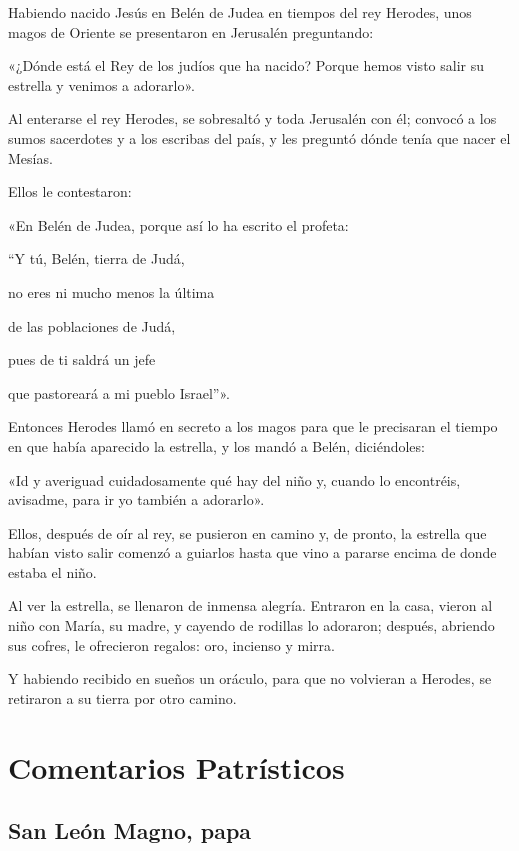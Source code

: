 		\begin{scripture}
			Habiendo nacido Jesús en Belén de Judea en tiempos del rey Herodes, unos magos de Oriente se presentaron en Jerusalén preguntando:
			
			«¿Dónde está el Rey de los judíos que ha nacido? Porque hemos visto salir su estrella y venimos a adorarlo».
			
			Al enterarse el rey Herodes, se sobresaltó y toda Jerusalén con él; convocó a los sumos sacerdotes y a los escribas del país, y les preguntó dónde tenía que nacer el Mesías.
			
			Ellos le contestaron:
			
			«En Belén de Judea, porque así lo ha escrito el profeta:
			
			``Y tú, Belén, tierra de Judá,
			
			no eres ni mucho menos la última
			
			de las poblaciones de Judá,
			
			pues de ti saldrá un jefe
			
			que pastoreará a mi pueblo Israel''».
			
			Entonces Herodes llamó en secreto a los magos para que le precisaran el tiempo en que había aparecido la estrella, y los mandó a Belén, diciéndoles:
			
			«Id y averiguad cuidadosamente qué hay del niño y, cuando lo encontréis, avisadme, para ir yo también a adorarlo».
			
			Ellos, después de oír al rey, se pusieron en camino y, de pronto, la estrella que habían visto salir comenzó a guiarlos hasta que vino a pararse encima de donde estaba el niño.
			
			Al ver la estrella, se llenaron de inmensa alegría. Entraron en la casa, vieron al niño con María, su madre, y cayendo de rodillas lo adoraron; después, abriendo sus cofres, le ofrecieron regalos: oro, incienso y mirra.
			
			Y habiendo recibido en sueños un oráculo, para que no volvieran a Herodes, se retiraron a su tierra por otro camino.
		\end{scripture}


\newsection

	\section{Comentarios Patrísticos}
	
		\subsection{San León Magno, papa}
		
